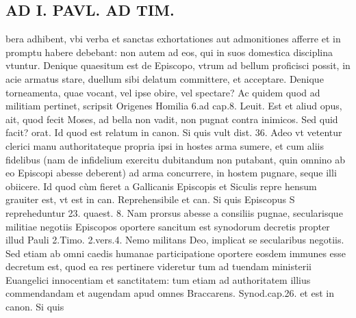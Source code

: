 \documentclass{article}
\begin{document}
\begin{pages}
\section*{AD I. PAVL. AD TIM. }
\marginpar{[ p.334 ]}\pstart bera adhibent, vbi verba et sanctas exhortationes aut admonitiones afferre et in promptu habere debebant: non autem ad eos, qui in suos domestica disciplina vtuntur.  \pend\pstart Denique quaesitum est de Episcopo, vtrum ad bellum proficisci possit, in acie armatus stare, duellum sibi delatum committere, et acceptare. Denique torneamenta, quae vocant, vel ipse obire, vel spectare? Ac quidem quod ad militiam pertinet, scripsit Origenes Homilia 6.ad cap.8. Leuit. Est et aliud opus, ait, quod fecit Moses, ad bella non vadit, non pugnat contra inimicos. Sed quid facit? orat. Id quod est relatum in canon. Si quis vult dist. 36. Adeo vt vetentur clerici manu authoritateque  propria ipsi in hostes arma sumere, et cum aliis fidelibus (nam de infidelium exercitu dubitandum non putabant, quin omnino ab eo Episcopi abesse deberent) ad arma concurrere, in hostem pugnare, seque  illi obiicere. Id quod cùm fieret a Gallicanis Episcopis et Siculis repre hensum grauiter est, vt est in can. Reprehensibile et can. Si quis Episcopus S repreheduntur 23. quaest. 8. Nam prorsus abesse a consiliis pugnae, secularisque  militiae negotiis Episcopos oportere sancitum est synodorum decretis propter illud Pauli 2.Timo. 2.vers.4. Nemo militans Deo, implicat se secularibus negotiis. Sed etiam ab omni caedis humanae participatione oportere eosdem immunes esse decretum est, quod ea res pertinere videretur tum ad tuendam ministerii Euangelici innocentiam et sanctitatem: tum etiam ad authoritatem illius commendandam et augendam apud omnes Braccarens. Synod.cap.26. et est in canon. Si quis  \pend

\end{pages}
\end{document}
